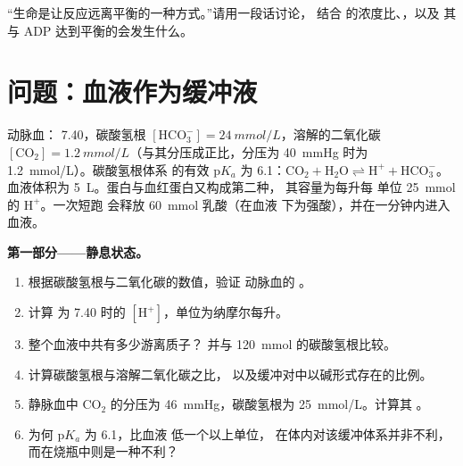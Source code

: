\begin{exercise}[$\star\star\star$]\label{exo:b1:water-small-molecules:12}
“生命是让反应远离平衡的一种方式。”请用一段话讨论，
结合  的浓度比、，以及
其  与 ADP 达到平衡的会发生什么。
\end{exercise}

\section{问题：血液作为缓冲液}

\begin{problem}
\label{pb:b1:water-small-molecules:1}
动脉血： 7.40，碳酸氢根 $[\mathrm{HCO_3^-}] =
\qty{24}{mmol/L}$，溶解的二氧化碳 $[\mathrm{CO_2}] =
\qty{1.2}{mmol/L}$（与其分压成正比，分压为
\qty{40}{mmHg} 时为 \qty{1.2}{mmol/L}）。碳酸氢根体系
的有效 p$K_a$ 为 6.1：$\mathrm{CO_2} + \mathrm{H_2O}
\rightleftharpoons \mathrm{H^+} + \mathrm{HCO_3^-}$。血液体积为
\qty{5}{L}。蛋白与血红蛋白又构成第二种，
其容量为每升每  单位 \qty{25}{mmol} 的 $\mathrm{H^+}$。一次短跑
会释放 \qty{60}{mmol} 乳酸（在血液
 下为强酸），并在一分钟内进入血液。

\medskip
\noindent\textbf{第一部分——静息状态。}
\begin{enumerate}
  \item 根据碳酸氢根与二氧化碳的数值，验证
        动脉血的 。
  \item 计算  为 7.40 时的 $[\mathrm{H^+}]$，单位为纳摩尔每升。
  \item 整个血液中共有多少游离质子？
        并与 \qty{120}{mmol} 的碳酸氢根比较。
  \item 计算碳酸氢根与溶解二氧化碳之比，
        以及缓冲对中以碱形式存在的比例。
  \item 静脉血中 $\mathrm{CO_2}$ 的分压为
        \qty{46}{mmHg}，碳酸氢根为 \qty{25}{mmol/L}。计算其
        。
  \item 为何 p$K_a$ 为 6.1，比血液  低一个以上单位，
        在体内对该缓冲体系并非不利，
        而在烧瓶中则是一种不利？
\end{enumerate}


\end{problem}
